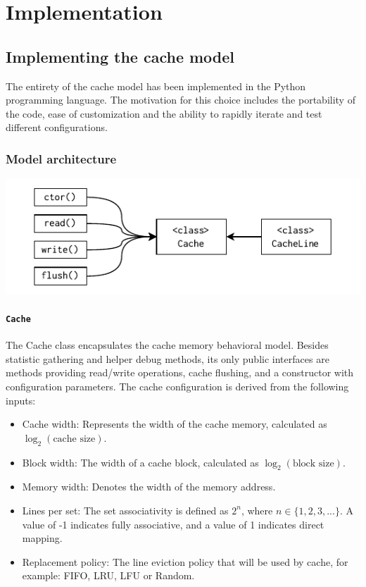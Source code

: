 
\chapter{Implementation}

\section{Implementing the cache model}

The entirety of the cache model has been implemented in the Python programming language. The motivation for this choice includes the portability of the code, ease of customization and
the ability to rapidly iterate and test different configurations.

\subsection{Model architecture}

\begin{center}
	\centering
	\includegraphics[width=\textwidth]{figures/04-implementation/cache_mdl_arch.pdf}
	\label{fig:cache_mdl_arch}
\end{center}

\subsubsection{\texttt{Cache}} \label{sec:cache_model}

The Cache class encapsulates the cache memory behavioral model. Besides statistic gathering and helper debug methods, its only public interfaces are methods
providing read/write operations, cache flushing, and a constructor with configuration parameters. The cache configuration is derived from the following inputs:
\begin{itemize}
    \item Cache width: Represents the width of the cache memory, calculated as \(\log_2(\text{cache size})\).
    \item Block width: The width of a cache block, calculated as \(\log_2(\text{block size})\).
    \item Memory width: Denotes the width of the memory address.
    \item Lines per set: The set associativity is defined as $2^n$, where $n \in \{1, 2, 3, ...\}$. A value of -1 indicates fully associative, and a value of 1 indicates direct mapping.
	\item Replacement policy: The line eviction policy that will be used by cache, for example: FIFO, LRU, LFU or Random.
\end{itemize}

